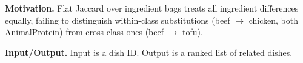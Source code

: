 \textbf{Motivation.} Flat Jaccard over ingredient bags treats all ingredient differences equally, failing to distinguish within-class substitutions (beef $\to$ chicken, both AnimalProtein) from cross-class ones (beef $\to$ tofu).

\textbf{Input/Output.} Input is a dish ID. Output is a ranked list of related dishes.



